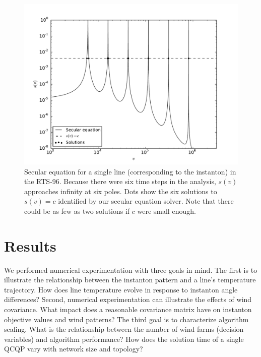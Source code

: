 \documentclass[journal,twoside]{IEEEtran}
\begin{document}
\begin{figure}[h]
\centering
\includegraphics[trim=0.3in 0.in 0.7in 0.4in,clip,width=1\linewidth]{images/secular}
\caption{Secular equation for a single line (corresponding to the instanton) in the RTS-96. Because there were six time steps in the analysis, $s(v)$ approaches infinity at six poles. Dots show the six solutions to $s(v) = c$ identified by our secular equation solver. Note that there could be as few as two solutions if $c$ were small enough.}
\label{fig:secular}
\end{figure}


\section{Results}\label{sec:results}
We performed numerical experimentation with three goals in mind. The first is to illustrate the relationship between the instanton pattern and a line's temperature trajectory. How does line temperature evolve in response to instanton angle differences? Second, numerical experimentation can illustrate the effects of wind covariance. What impact does a reasonable covariance matrix have on instanton objective values and wind patterns? The third goal is to characterize algorithm scaling. What is the relationship between the number of wind farms (decision variables) and algorithm performance? How does the solution time of a single QCQP vary with network size and topology?
\end{document}
